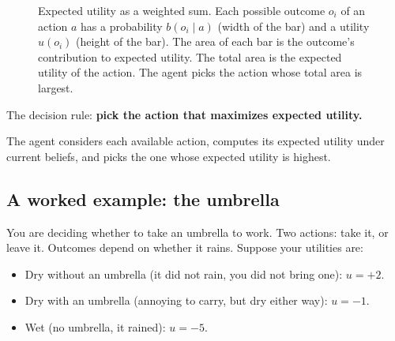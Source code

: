 \begin{figure}[h]
\centering
{}
\caption{Expected utility as a weighted sum. Each possible outcome $o_i$ of an action $a$ has a probability $b(o_i \mid a)$ (width of the bar) and a utility $u(o_i)$ (height of the bar). The area of each bar is the outcome's contribution to expected utility. The total area is the expected utility of the action. The agent picks the action whose total area is largest.}
\label{fig:expected-utility}
\end{figure}

The decision rule: \textbf{pick the action that maximizes expected utility.}

The agent considers each available action, computes its expected utility under current beliefs, and picks the one whose expected utility is highest.

\subsection*{A worked example: the umbrella}

You are deciding whether to take an umbrella to work. Two actions: take it, or leave it. Outcomes depend on whether it rains. Suppose your utilities are:

\begin{itemize}
\item Dry without an umbrella (it did not rain, you did not bring one): $u = +2$.
\item Dry with an umbrella (annoying to carry, but dry either way): $u = -1$.
\item Wet (no umbrella, it rained): $u = -5$.
\end{itemize}

